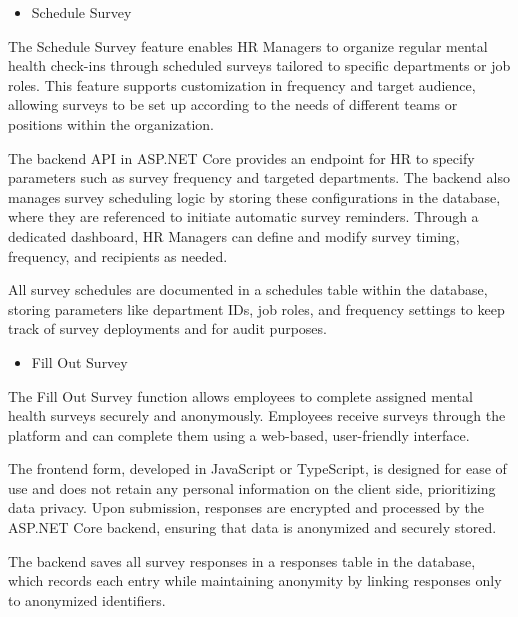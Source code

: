 \documentclass[conference]{IEEEtran}
\begin{document}
    \begin{itemize}
        \item Schedule Survey 
        \end{itemize}

    The Schedule Survey feature enables HR Managers to organize 
    regular mental health check-ins through scheduled surveys 
    tailored to specific departments or job roles. This feature 
    supports customization in frequency and target audience, 
    allowing surveys to be set up according to the needs of 
    different teams or positions within the organization. 
    \newline

    The backend API in ASP.NET Core provides an endpoint for HR to 
    specify parameters such as survey frequency and targeted 
    departments. The backend also manages survey scheduling 
    logic by storing these configurations in the database, where 
    they are referenced to initiate automatic survey reminders. 
    Through a dedicated dashboard, HR Managers can define and 
    modify survey timing, frequency, and recipients as needed. 
    \newline

    All survey schedules are documented in a schedules table 
    within the database, storing parameters like department IDs, 
    job roles, and frequency settings to keep track of survey 
    deployments and for audit purposes.
    \newline
   
    \begin{itemize}
        \item Fill Out Survey 
    \end{itemize}

    The Fill Out Survey function allows employees to complete 
    assigned mental health surveys securely and anonymously. 
    Employees receive surveys through the platform and can complete 
    them using a web-based, user-friendly interface. 
    \newline
    
    The frontend form, developed in JavaScript or TypeScript, is designed for 
    ease of use and does not retain any personal information on 
    the client side, prioritizing data privacy. Upon submission, 
    responses are encrypted and processed by the ASP.NET Core 
    backend, ensuring that data is anonymized and securely stored.
    \newline

    The backend saves all survey responses in a responses table in 
    the database, which records each entry while maintaining 
    anonymity by linking responses only to anonymized identifiers.
    \newline    
\end{document}
